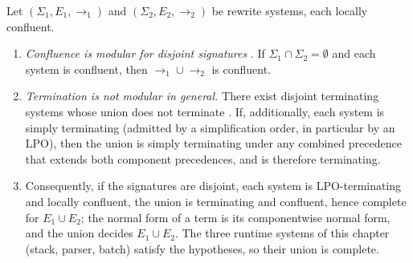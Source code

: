 \begin{theorem}\label{thm:54}
Let $(\Sigma_1, E_1, \to_1)$ and $(\Sigma_2, E_2, \to_2)$ be rewrite
systems, each locally confluent.
\begin{enumerate}
\item[(i)] \emph{Confluence is modular for disjoint signatures}
\citep{toyama}. If $\Sigma_1 \cap \Sigma_2 = \emptyset$ and each system
is confluent, then $\to_1 \cup \to_2$ is confluent.
\item[(ii)] \emph{Termination is not modular in general.} There exist
disjoint terminating systems whose union does not terminate
\citep{toyama}. If, additionally, each system is simply terminating
(admitted by a simplification order, in particular by an LPO), then the
union is simply terminating under any combined precedence that extends
both component precedences, and is therefore terminating.
\item[(iii)] Consequently, if the signatures are disjoint, each system
is LPO-terminating and locally confluent, the union is terminating and
confluent, hence complete for $E_1 \cup E_2$; the normal form of a term
is its componentwise normal form, and the union decides $E_1 \cup E_2$.
The three runtime systems of this chapter (stack, parser, batch) satisfy
the hypotheses, so their union is complete.
\end{enumerate}
\end{theorem}

